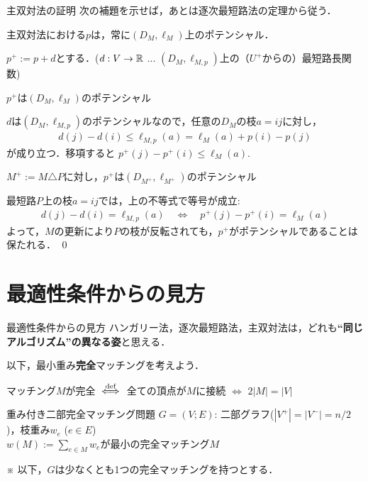 \documentclass[14pt,aspectratio=169,xcolor=dvipsnames,table,onlytextwidth,dvipdfmx]{beamer}
\begin{document}
\begin{frame}{主双対法の証明}
    \small
    次の補題を示せば，あとは逐次最短路法の定理から従う．
    
    \begin{lemma}
    主双対法における$p$は，常に$(D_M, \ell_M)$上のポテンシャル．
    \end{lemma}
    \pause
    $p^+ := p + d$とする．{\footnotesize ($d: V \to \mathbb{R}$ ... $(D_M, \ell_{M,p})$上の（$U^+$からの）最短路長関数)}

    \bigskip
     $p^+$は$(D_M, \ell_M)$のポテンシャル 

    \pause
    {\footnotesize 
         $d$は$(D_M, \ell_{M,p})$のポテンシャルなので，任意の$D_M$の枝$a = ij$に対し，
    \begin{align*}
        d(j) - d(i) \leq \ell_{M,p}(a) = \ell_M(a) + p(i) - p(j)
    \end{align*}
    が成り立つ．移項すると $p^+(j) - p^+(i) \leq \ell_M(a)$.
    }

    \pause
    \bigskip
     $M^+ := M \triangle P$に対し，$p^+$は$(D_{M^+}, \ell_{M^+})$のポテンシャル

    \pause
    {\footnotesize {} 
    最短路$P$上の枝$a = ij$では，上の不等式で等号が成立:
    \begin{align*}
        d(j) - d(i) = \ell_{M,p}(a) \quad \iff \quad p^+(j) - p^+(i) = \ell_M(a)
    \end{align*}
    よって，$M$の更新により$P$の枝が反転されても，$p^+$がポテンシャルであることは保たれる． }
    \qed
\end{frame}

\section{最適性条件からの見方}

\begin{frame}{最適性条件からの見方}
    ハンガリー法，逐次最短路法，主双対法は，どれも\textbf{“同じアルゴリズム”の異なる姿}と思える．

    \bigskip\pause
    以下，最小重み\textbf{完全}マッチングを考えよう．

    \vfill
    \small
    マッチング$M$が\alert{完全} $\overset{\text{def}}{\iff}$ 全ての頂点が$M$に接続 $\iff$ $2|M| = |V|$

    \begin{block}{重み付き二部完全マッチング問題}
         $G=(V; E)$: 二部グラフ($|V^+|=|V^-|=n/2$)，枝重み$w_e$ ($e \in E$) \\
         $w(M) := \sum_{e\in M}w_e$が最小の完全マッチング$M$
    \end{block}
    ※ 以下，$G$は少なくとも1つの完全マッチングを持つとする．
\end{frame}
\end{document}
